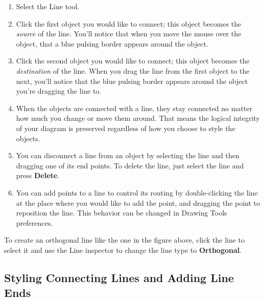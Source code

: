 \documentclass[../main.tex]{subfiles}
\begin{document}
\begin{enumerate}
  \item Select the Line tool.

  \item Click the first object you would like to connect; this object becomes the
    \textit{source} of the line. You'll notice that when you move the mouse over the object,
    that a blue pulsing border appears around the object.

  \item Click the second object you would like to connect; this object becomes the
    \textit{destination} of the line. When you drag the line from the first object to the next,
    you'll notice that the blue pulsing border appears around the object you're dragging the
    line to.

  \item When the objects are connected with a line, they stay connected no matter how much you
    change or move them around. That means the logical integrity of your diagram is preserved
    regardless of how you choose to style the objects.

  \item You can disconnect a line from an object by selecting the line and then dragging one of
    its end points. To delete the line, just select the line and press \textbf{Delete}.

  \item You can add points to a line to control its routing by double-clicking the line at the
    place where you would like to add the point, and dragging the point to reposition the line.
    This behavior can be changed in Drawing Tools preferences.

\end{enumerate}

\begin{ogtip}
  To create an orthogonal line like the one in the figure above, click the line to select it and
  use the Line inspector to change the line type to \textbf{Orthogonal}.
\end{ogtip}

\subsection{Styling Connecting Lines and Adding Line Ends}
\end{document}
